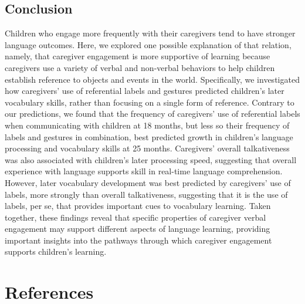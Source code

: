 \documentclass[
  man,floatsintext]{apa6}
\begin{document}
\hypertarget{conclusion}{%
\subsection{Conclusion}\label{conclusion}}

Children who engage more frequently with their caregivers tend to have stronger language outcomes. Here, we explored one possible explanation of that relation, namely, that caregiver engagement is more supportive of learning because caregivers use a variety of verbal and non-verbal behaviors to help children establish reference to objects and events in the world. Specifically, we investigated how caregivers' use of referential labels and gestures predicted children's later vocabulary skills, rather than focusing on a single form of reference. Contrary to our predictions, we found that the frequency of caregivers' use of referential labels when communicating with children at 18 months, but less so their frequency of labels and gestures in combination, best predicted growth in children's language processing and vocabulary skills at 25 months. Caregivers' overall talkativeness was also associated with children's later processing speed, suggesting that overall experience with language supports skill in real-time language comprehension. However, later vocabulary development was best predicted by caregivers' use of labels, more strongly than overall talkativeness, suggesting that it is the use of labels, per se, that provides important cues to vocabulary learning. Taken together, these findings reveal that specific properties of caregiver verbal engagement may support different aspects of language learning, providing important insights into the pathways through which caregiver engagement supports children's learning.

\newpage

\hypertarget{references}{%
\section{References}\label{references}}
\end{document}
